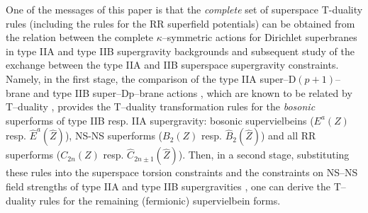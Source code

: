 \documentclass[a4paper,11pt]{article}
\begin{document}
One of the messages of this paper is that the {\it complete} set of 
superspace T-duality rules 
(including the rules for the RR superfield potentials)
can be obtained from the relation between 
the complete $\kappa$--symmetric actions 
for Dirichlet superbranes in type IIA and type IIB 
supergravity backgrounds 
and subsequent study of the
exchange between the type IIA and IIB superspace supergravity constraints.  
Namely, in the first stage, the comparison of the 
type IIA super--D$(p+1)$--brane and type IIB 
super--Dp--brane actions \cite{c0}, 
which are known to be related by T--duality \cite{Polch0,Polch}, 
provides  the T--duality transformation rules for the {\it bosonic} superforms 
of type IIB resp. IIA supergravity:   
bosonic supervielbeins ($E^a(Z)$ resp. $\hat{E}^a(\hat{Z})$), 
NS-NS superforms ($B_2(Z)$ resp. $\hat{B}_2(\hat{Z})$)
and all RR superforms ($C_{2n}(Z)$ resp. $\hat{C}_{2n\pm 1}(\hat{Z})$).   
Then, in a second stage, 
substituting these rules into the 
superspace torsion constraints and the constraints 
on NS--NS field strengths of type IIA and type IIB supergravities 
\cite{HW84,CGO87,c0}, one can derive the T--duality rules for the remaining 
(fermionic) supervielbein forms.  
\end{document}
